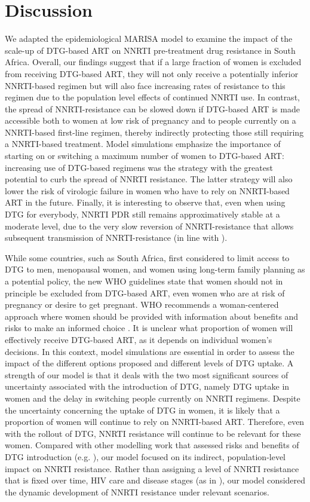 \documentclass[10pt,letterpaper]{article}
\begin{document}
\section*{Discussion}
We adapted the epidemiological MARISA model to examine the impact of the scale-up of DTG-based ART on NNRTI pre-treatment drug resistance in South Africa. Overall, our findings suggest that if a large fraction of women is excluded from receiving DTG-based ART, they will not only receive a potentially inferior NNRTI-based regimen but will also face increasing rates of resistance to this regimen due to the population level effects of continued NNRTI use. In contrast, the spread of NNRTI-resistance can be slowed down if DTG-based ART is made accessible both to women at low risk of pregnancy and to people currently on a NNRTI-based first-line regimen, thereby indirectly protecting those still requiring a NNRTI-based treatment. Model simulations emphasize the importance of starting on or switching a maximum number of women to DTG-based ART: increasing use of DTG-based regimens was the strategy with the greatest potential to curb the spread of NNRTI resistance. The latter strategy will also lower the risk of virologic failure in women who have to rely on NNRTI-based ART in the future. Finally, it is interesting to observe that, even when using DTG for everybody, NNRTI PDR still remains approximatively stable at a moderate level, due to the very slow reversion of NNRTI-resistance that allows subsequent transmission of NNRTI-resistance (in line with \cite{Yang2015}).

While some countries, such as South Africa, first considered to limit access to DTG to men, menopausal women, and women using long-term family planning as a potential policy, the new WHO guidelines state that women should not in principle be excluded from DTG-based ART, even women who are at risk of pregnancy or desire to get pregnant. WHO recommends a woman-centered approach where women should be provided with information about benefits and risks to make an informed choice \cite{Milanga2018,WHO2019}. It is unclear what proportion of women will effectively receive DTG-based ART, as it depends on individual women’s decisions. In this context, model simulations are essential in order to assess the impact of the different options proposed and different levels of DTG uptake. A strength of our model is that it deals with the two most significant sources of uncertainty associated with the introduction of DTG, namely DTG uptake in women and the delay in switching people currently on NNRTI regimens. Despite the uncertainty concerning the uptake of DTG in women, it is likely that a proportion of women will continue to rely on NNRTI-based ART. Therefore, even with the rollout of DTG, NNRTI resistance will continue to be relevant for these women. Compared with other modelling work that assessed risks and benefits of DTG introduction (e.g. \cite{Dugdale2019}), our model focused on its indirect, population-level impact on NNRTI resistance. Rather than assigning a level of NNRTI resistance that is fixed over time, HIV care and disease stages (as in \cite{Dugdale2019}), our model considered the dynamic development of NNRTI resistance under relevant scenarios.
\end{document}
